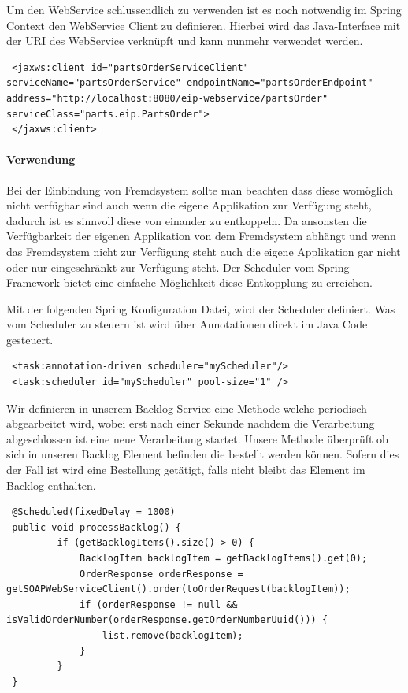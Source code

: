 \documentclass[12pt,a4paper,ngerman]{article}
\begin{document}
Um den WebService schlussendlich zu verwenden ist es noch notwendig im
Spring Context den WebService Client zu definieren. Hierbei wird das
Java-Interface mit der URI des WebService verknüpft und kann nunmehr
verwendet werden.

\begin{lstlisting}
 <jaxws:client id="partsOrderServiceClient" serviceName="partsOrderService" endpointName="partsOrderEndpoint" address="http://localhost:8080/eip-webservice/partsOrder" serviceClass="parts.eip.PartsOrder">
 </jaxws:client>
\end{lstlisting}

\paragraph{Verwendung}

Bei der Einbindung von Fremdsystem sollte man beachten dass diese
womöglich nicht verfügbar sind auch wenn die eigene Applikation zur
Verfügung steht, dadurch ist es sinnvoll diese von einander zu
entkoppeln. Da ansonsten die Verfügbarkeit der eigenen Applikation von
dem Fremdsystem abhängt und wenn das Fremdsystem nicht zur Verfügung
steht auch die eigene Applikation gar nicht oder nur eingeschränkt zur
Verfügung steht. Der Scheduler vom Spring Framework bietet eine einfache
Möglichkeit diese Entkopplung zu erreichen.

Mit der folgenden Spring Konfiguration Datei, wird der Scheduler
definiert. Was vom Scheduler zu steuern ist wird über Annotationen
direkt im Java Code gesteuert.

\begin{lstlisting}
 <task:annotation-driven scheduler="myScheduler"/>
 <task:scheduler id="myScheduler" pool-size="1" />
\end{lstlisting}

Wir definieren in unserem Backlog Service eine Methode welche periodisch
abgearbeitet wird, wobei erst nach einer Sekunde nachdem die
Verarbeitung abgeschlossen ist eine neue Verarbeitung startet. Unsere
Methode überprüft ob sich in unseren Backlog Element befinden die
bestellt werden können. Sofern dies der Fall ist wird eine Bestellung
getätigt, falls nicht bleibt das Element im Backlog enthalten.

\begin{lstlisting}
 @Scheduled(fixedDelay = 1000)
 public void processBacklog() {
         if (getBacklogItems().size() > 0) {
             BacklogItem backlogItem = getBacklogItems().get(0);
             OrderResponse orderResponse = getSOAPWebServiceClient().order(toOrderRequest(backlogItem));
             if (orderResponse != null && isValidOrderNumber(orderResponse.getOrderNumberUuid())) {
                 list.remove(backlogItem);
             } 
         }
 }
\end{lstlisting}
\end{document}
